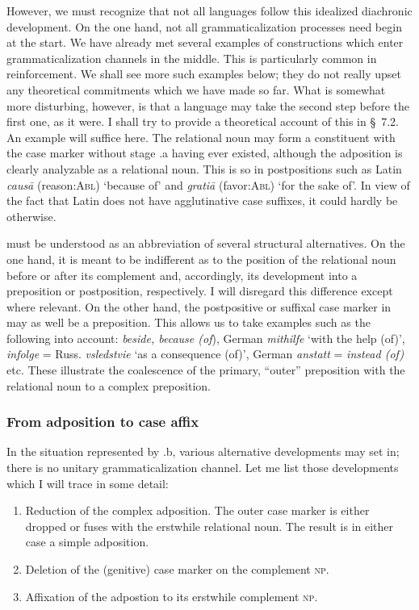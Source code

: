 However, we must recognize that not all languages follow this idealized diachronic development. On the one hand, not all grammaticalization processes need begin at the start. We have already met several examples of constructions which enter grammaticalization channels in the middle. This is particularly common in reinforcement. We shall see more such examples below; they do not really upset any theoretical commitments which we have made so far. What is somewhat more disturbing, however, is that a language may take the second step before the first one, as it were. I shall try to provide a theoretical account of this in §~7.2. An example will suffice here. The relational noun may form a constituent with the case marker without stage .a having ever existed, although the adposition is clearly analyzable as a relational noun. This is so in postpositions such as Latin \textit{caus\=a} (reason:\textsc{Abl}) ‘because of’ and \textit{grati\=a} (favor:\textsc{Abl}) ‘for the sake of’. In view of the fact that Latin does not have agglutinative case suffixes, it could hardly be otherwise.

 must be understood as an abbreviation of several structural alternatives. On the one hand, it is meant to be indifferent as to the position of the relational noun before or after its complement and, accordingly, its development into a preposition or postposition, respectively. I will disregard this difference except where relevant. On the other hand, the postpositive or suffixal case marker in  may as well be a preposition. This allows us to take examples such as the following into account: \textit{beside, because (of}), German \textit{mithilfe} ‘with the help (of)’, \textit{infolge} = Russ. \textit{vsledstvie} ‘as a consequence (of)’, German \textit{anstatt} = \textit{instead (of)} etc. These illustrate the coalescence of the primary, “outer” preposition with the relational noun to a complex preposition.

\subsubsection{From adposition to case affix} \label{sec:3.4.1.3}
In the situation represented by .b, various alternative developments may set in; there is no unitary grammaticalization channel. Let me list those developments which I will trace in some detail:

\begin{enumerate}
\item Reduction of the complex adposition. The outer case marker is either dropped or fuses with the erstwhile relational noun. The result is in either case a simple adposition.

\item Deletion of the (genitive) case marker on the complement \textsc{np}.

\item Affixation of the adpostion to its erstwhile complement \textsc{np}.
\end{enumerate}

